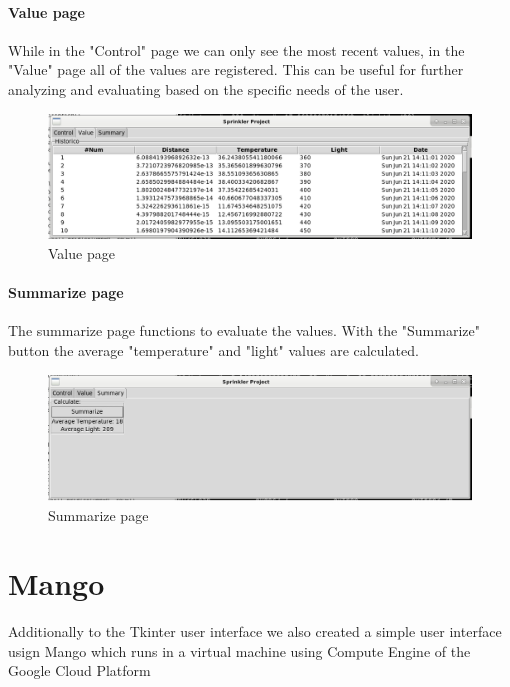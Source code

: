 \documentclass{article}
\begin{document}
\paragraph{Value page}
While in the "Control" page we can only see the most recent values, in the "Value" page all of the values are registered. This can be useful for further analyzing and evaluating based on the specific needs of the user.
\begin{figure}
\centering
\includegraphics[scale=0.3]{value_view.png}
\caption{Value page}
\label{fig:value}
\end{figure}
\paragraph{Summarize page}
The summarize page functions to evaluate the values. With the "Summarize" button the average "temperature" and "light" values are calculated.
\begin{figure}
\centering
\includegraphics[scale=0.3]{summarize_view.png}
\caption{Summarize page}
\label{fig:summarize}
\end{figure}

\section{Mango}
Additionally to the Tkinter user interface we also created a simple user interface usign Mango which runs in a virtual machine using Compute Engine of the Google Cloud Platform
\end{document}
